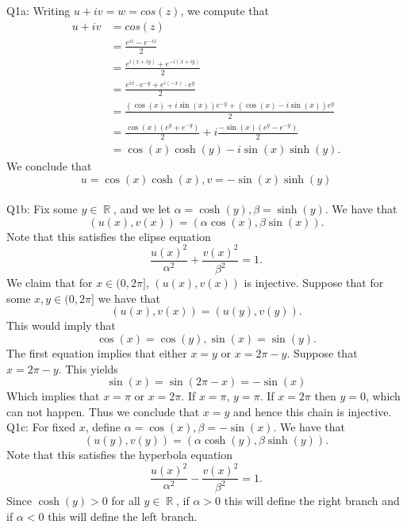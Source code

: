 \documentclass[letterpaper]{article}
\DeclareMathOperator{\R}{\mathbb{R}}
\begin{document}
\noindent
Q1a: Writing $u+ iv = w = cos(z)$, we compute that 
\begin{align*}
    u+ iv & = cos(z)
    \\ & = \frac{e^{iz} - e^{-iz}}{2}
    \\ & = \frac{e^{i(x+iy)} + e^{-i(x+iy)}}{2}
    \\ & = \frac{e^{ix} \cdot e^{-y} + e^{i(-x)} \cdot e^{y}}{2}
    \\ & = \frac{(\cos(x) + i\sin(x))e^{-y} + (\cos(x) - i \sin(x))e^y}{2}
    \\ & = \frac{\cos(x)(e^y + e^{-y})}{2} + i \frac{-\sin(x)(e^{y} - e^{-y})}{2}
    \\ & = \cos(x)\cosh(y) - i\sin(x)\sinh(y). 
\end{align*}
We conclude that $$u = \cos(x) \cosh(x), v = - \sin(x)\sinh(y)$$
\newline \\ \noindent Q1b: Fix some $y\in \R$, and we let $\alpha = \cosh(y), \beta = \sinh(y)$. We have that $$(u(x),v(x)) = (\alpha \cos(x), \beta \sin(x)). $$
Note that this satisfies the elipse equation $$\frac{u(x)^2}{\alpha^2} + \frac{v(x)^2}{\beta^2} = 1.$$
We claim that for $x\in (0,2\pi]$, $(u(x), v(x))$ is injective. Suppose that for some $x,y \in (0, 2\pi]$ we have that $$(u(x), v(x)) = (u(y), v(y)). $$ This would imply that $$\cos(x) = \cos(y), \sin(x) = \sin(y). $$ The first equation implies that either $x=y$ or $x = 2\pi -y$. Suppose that $x = 2\pi - y$.
This yields $$\sin(x) = \sin(2\pi - x) = -\sin(x)$$
Which implies that $x = \pi $ or $x = 2 \pi$. If $x = \pi$, $y= \pi$. If $x = 2\pi$ then $y = 0$, which can not happen. Thus we conclude that $x=y$ and hence this chain is injective. 
\newline \\ \noindent Q1c: For fixed $x$, define $\alpha = \cos(x), \beta = -\sin(x)$. We have that $$(u(y), v(y)) = (\alpha \cosh(y), \beta \sinh(y)). $$ Note that this satisfies the hyperbola equation $$\frac{u(x)^2}{\alpha^2} - \frac{v(x)^2}{\beta^2} = 1. $$ Since $\cosh(y)> 0$ for all $y\in \R$, if $\alpha>0$ this will define the right branch and if $\alpha<0$ this will define the left branch. 
\end{document}
